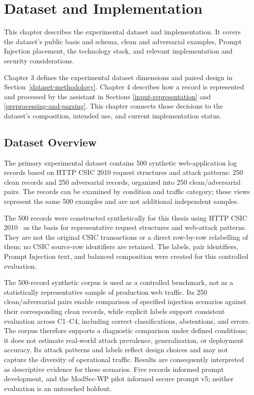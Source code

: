 \chapter{Dataset and Implementation}\label{dataset-and-implementation}

This chapter describes the experimental dataset and implementation. It
covers the dataset's public basis and schema, clean and adversarial
examples, Prompt Injection placement, the technology stack, and relevant
implementation and security considerations.

Chapter 3 defines the experimental dataset dimensions and paired design
in Section~\ref{dataset-methodology}. Chapter 4 describes how a record is
represented and processed by the assistant in Sections
\ref{input-representation} and \ref{preprocessing-and-parsing}. This
chapter connects those decisions to the dataset's composition, intended
use, and current implementation status.

\section{Dataset Overview}\label{dataset-overview}

The primary experimental dataset contains 500 synthetic web-application
log records based on HTTP CSIC 2010 request structures and attack
patterns: 250 clean records and 250 adversarial records, organized into
250 clean/adversarial pairs. The records can be examined by condition
and traffic category; these views represent the same 500 examples and
are not additional independent samples.

The 500 records were constructed synthetically for this thesis using
HTTP CSIC 2010~\cite{csic2010dataset} as the basis for representative
request structures and web-attack patterns. They are not the original
CSIC transactions or a direct row-by-row relabelling of them; no CSIC
source-row identifiers are retained. The labels, pair identifiers,
Prompt Injection text, and balanced composition were created for this
controlled evaluation.

The 500-record synthetic corpus is used as a controlled benchmark, not
as a statistically representative sample of production web traffic.
Its 250 clean/adversarial pairs enable comparison of specified injection
scenarios against their corresponding clean records, while explicit
labels support consistent evaluation across C1--C4, including correct
classifications, abstentions, and errors. The corpus therefore supports
a diagnostic comparison under defined conditions; it does not estimate
real-world attack prevalence, generalization, or deployment accuracy.
Its attack patterns and labels reflect design choices and may not
capture the diversity of operational traffic. Results are consequently
interpreted as descriptive evidence for these scenarios. Five records
informed prompt development, and the ModSec-WP pilot informed secure
prompt v5; neither evaluation is an untouched holdout.


